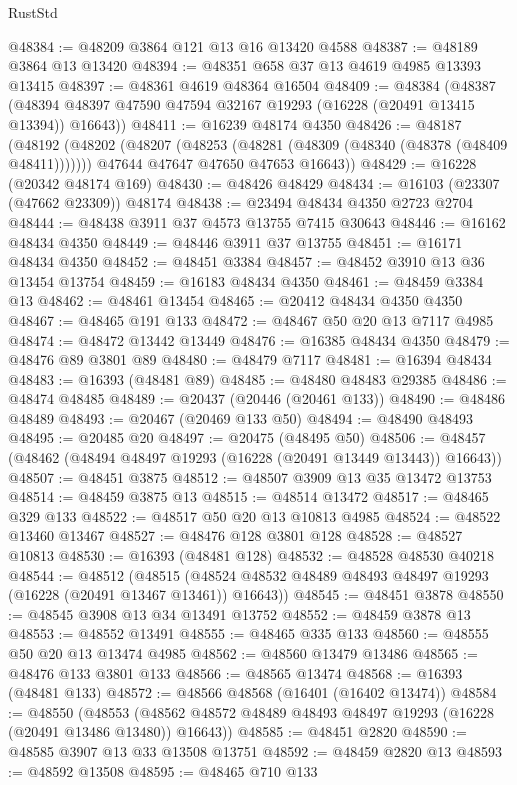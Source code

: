 \begin{lexlean}{RustStd}
\begin{coremodule}
@48384 := @48209 @3864 @121 @13 @16 @13420 @4588
@48387 := @48189 @3864 @13 @13420
@48394 := @48351 @658 @37 @13 @4619 @4985 @13393 @13415
@48397 := @48361 @4619 @48364 @16504
@48409 := @48384
    (@48387 (@48394 @48397 @47590 @47594 @32167 @19293 (@16228 (@20491 @13415 @13394)) @16643))
@48411 := @16239 @48174 @4350
@48426 := @48187
    (@48192
      (@48202
        (@48207 (@48253 (@48281 (@48309 (@48340 (@48378 (@48409 @48411)))))))
        @47644
        @47647
        @47650
        @47653
        @16643))
@48429 := @16228 (@20342 @48174 @169)
@48430 := @48426 @48429
@48434 := @16103 (@23307 (@47662 @23309)) @48174
@48438 := @23494 @48434 @4350 @2723 @2704
@48444 := @48438 @3911 @37 @4573 @13755 @7415 @30643
@48446 := @16162 @48434 @4350
@48449 := @48446 @3911 @37 @13755
@48451 := @16171 @48434 @4350
@48452 := @48451 @3384
@48457 := @48452 @3910 @13 @36 @13454 @13754
@48459 := @16183 @48434 @4350
@48461 := @48459 @3384 @13
@48462 := @48461 @13454
@48465 := @20412 @48434 @4350 @4350
@48467 := @48465 @191 @133
@48472 := @48467 @50 @20 @13 @7117 @4985
@48474 := @48472 @13442 @13449
@48476 := @16385 @48434 @4350
@48479 := @48476 @89 @3801 @89
@48480 := @48479 @7117
@48481 := @16394 @48434
@48483 := @16393 (@48481 @89)
@48485 := @48480 @48483 @29385
@48486 := @48474 @48485
@48489 := @20437 (@20446 (@20461 @133))
@48490 := @48486 @48489
@48493 := @20467 (@20469 @133 @50)
@48494 := @48490 @48493
@48495 := @20485 @20
@48497 := @20475 (@48495 @50)
@48506 := @48457 (@48462 (@48494 @48497 @19293 (@16228 (@20491 @13449 @13443)) @16643))
@48507 := @48451 @3875
@48512 := @48507 @3909 @13 @35 @13472 @13753
@48514 := @48459 @3875 @13
@48515 := @48514 @13472
@48517 := @48465 @329 @133
@48522 := @48517 @50 @20 @13 @10813 @4985
@48524 := @48522 @13460 @13467
@48527 := @48476 @128 @3801 @128
@48528 := @48527 @10813
@48530 := @16393 (@48481 @128)
@48532 := @48528 @48530 @40218
@48544 := @48512
    (@48515 (@48524 @48532 @48489 @48493 @48497 @19293 (@16228 (@20491 @13467 @13461)) @16643))
@48545 := @48451 @3878
@48550 := @48545 @3908 @13 @34 @13491 @13752
@48552 := @48459 @3878 @13
@48553 := @48552 @13491
@48555 := @48465 @335 @133
@48560 := @48555 @50 @20 @13 @13474 @4985
@48562 := @48560 @13479 @13486
@48565 := @48476 @133 @3801 @133
@48566 := @48565 @13474
@48568 := @16393 (@48481 @133)
@48572 := @48566 @48568 (@16401 (@16402 @13474))
@48584 := @48550
    (@48553 (@48562 @48572 @48489 @48493 @48497 @19293 (@16228 (@20491 @13486 @13480)) @16643))
@48585 := @48451 @2820
@48590 := @48585 @3907 @13 @33 @13508 @13751
@48592 := @48459 @2820 @13
@48593 := @48592 @13508
@48595 := @48465 @710 @133

\end{coremodule}
\end{lexlean}
